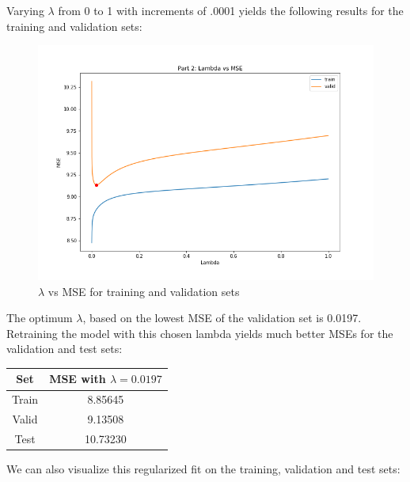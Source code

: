 \documentclass[paper=a4, fontsize=11pt]{scrartcl} %
\numberwithin{equation}{section} %
\numberwithin{figure}{section} %
\numberwithin{table}{section} %
\begin{document}
Varying \(\lambda\) from 0 to 1 with increments of .0001 yields the following results for the training and validation sets:

\begin{figure}[H]
    \includegraphics[width=\linewidth]{q1p14.png}
    \caption{\(\lambda\) vs MSE for training and validation sets}
    \label{fig:q1p14}
\end{figure}

The optimum \(\lambda\), based on the lowest MSE of the validation set is 0.0197. Retraining the model with this chosen lambda yields much better MSEs for the validation and test sets:

\begin{center}
\begin{tabular}{ |c|c| }
	\hline
	\textbf{Set} & \textbf{MSE with \(\lambda = 0.0197\)} \\
	\hline
    Train & 8.85645 \\
	Valid & 9.13508 \\
	Test & 10.73230 \\
	\hline
\end{tabular}
\end{center}

We can also visualize this regularized fit on the training, validation and test sets:
\end{document}
